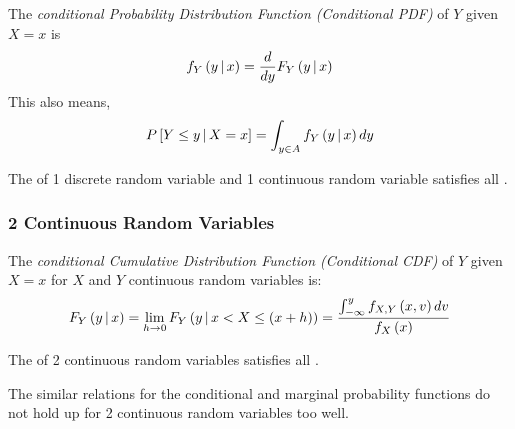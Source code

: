\begin{definition}\label{def:1 Discrete 1 Continuous-Conditional PDF}
  The \emph{conditional Probability Distribution Function (Conditional PDF)} of $Y$ given $X=x$ is
  \begin{equation}\label{eq:1 Discrete 1 Continuous-Conditional PDF}
    f_{Y} \left( y \operatorname{\vert} x \right) = \frac{d}{dy} F_{Y} \left( y \operatorname{\vert} x \right)
  \end{equation}
  This also means,
  \begin{equation*}
    P \left[ Y \leq y \operatorname{\vert} X=x \right]
    = \int_{y \in A} f_{Y} \left( y \operatorname{\vert} x \right) dy
  \end{equation*}
  \begin{remark}
    The  of 1 discrete random variable and 1 continuous random variable satisfies all .
  \end{remark}
\end{definition}

\subsubsection{2 Continuous Random Variables}\label{subsubsec:2 Continuous Random Variables}
\begin{definition}\label{def:2 Continuous-Conditional CDF}
  The \emph{conditional Cumulative Distribution Function (Conditional CDF)} of $Y$ given $X=x$ for $X$ and $Y$ continuous random variables is:
  \begin{equation}\label{eq:2 Continuous-Conditional CDF}
    F_{Y} \left(y \operatorname{\vert} x \right)
    = \lim\limits_{h\rightarrow 0} F_{Y} \left( y \operatorname{\vert} x < X \leq \left( x+h \right) \right)
    = \frac{\int_{-\infty}^{y} f_{X,Y} \left( x,v \right) dv}{f_{X} \left( x \right)}
  \end{equation}
  \begin{remark}
    The  of 2 continuous random variables satisfies all .
  \end{remark}
  \begin{remark}
    The similar relations for the conditional and marginal probability functions do not hold up for 2 continuous random variables too well.
  \end{remark}
\end{definition}

